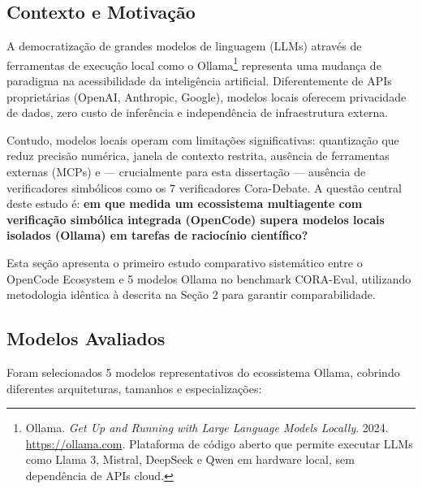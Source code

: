 ﻿%


\subsection{Contexto e Motivação}

A democratização de grandes modelos de linguagem (LLMs) através de ferramentas
de execução local como o Ollama\footnote{Ollama. \textit{Get Up and Running with
Large Language Models Locally}. 2024. \url{https://ollama.com}. Plataforma de
código aberto que permite executar LLMs como Llama 3, Mistral, DeepSeek e Qwen
em hardware local, sem dependência de APIs cloud.} representa uma mudança de
paradigma na acessibilidade da inteligência artificial. Diferentemente de APIs
proprietárias (OpenAI, Anthropic, Google), modelos locais oferecem privacidade
de dados, zero custo de inferência e independência de infraestrutura externa.

Contudo, modelos locais operam com limitações significativas: quantização que
reduz precisão numérica, janela de contexto restrita, ausência de ferramentas
externas (MCPs) e — crucialmente para esta dissertação — ausência de
verificadores simbólicos como os 7 verificadores Cora-Debate. A questão central
deste estudo é: \textbf{em que medida um ecossistema multiagente com
verificação simbólica integrada (OpenCode) supera modelos locais isolados
(Ollama) em tarefas de raciocínio científico?}

Esta seção apresenta o primeiro estudo comparativo sistemático entre o
OpenCode Ecosystem e 5 modelos Ollama no benchmark CORA-Eval, utilizando
metodologia idêntica à descrita na Seção 2 para garantir comparabilidade.

\subsection{Modelos Avaliados}

Foram selecionados 5 modelos representativos do ecossistema Ollama, cobrindo
diferentes arquiteturas, tamanhos e especializações:

